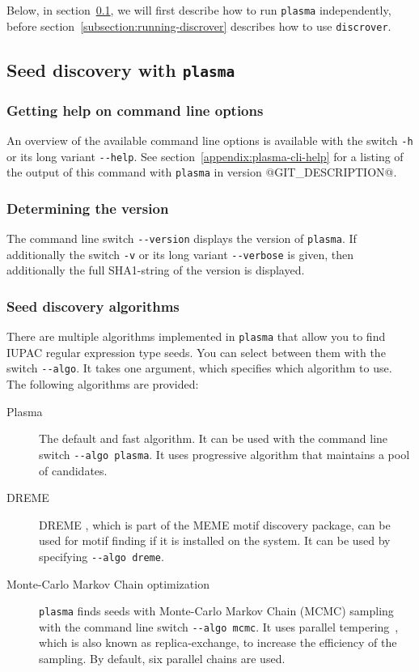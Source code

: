 \documentclass[a4paper]{article}
\makeatletter
\newcommand{\plasma}[0]{\texttt{plasma}}
\newcommand{\discrover}[0]{\texttt{discrover}}
\newcommand{\version}[0]{@GIT_DESCRIPTION@}
\makeatother
\begin{document}
Below, in section~\ref{subsection:running-plasma}, we will first describe how to run \plasma{} independently, before section~\ref{subsection:running-discrover} describes how to use \discrover{}.

\subsection{Seed discovery with \plasma{}}
\label{subsection:running-plasma}
\subsubsection{Getting help on command line options}
An overview of the available command line options is available with the switch \verb|-h| or its long variant \verb|--help|.
See section~\ref{appendix:plasma-cli-help} for a listing of the output of this command with \plasma{} in version \version{}.
\subsubsection{Determining the version}
The command line switch \verb|--version| displays the version of \plasma{}.
If additionally the switch \verb|-v| or its long variant \verb|--verbose| is given, then additionally the full SHA1-string of the version is displayed.

\subsubsection{Seed discovery algorithms}
\label{section:plasma-MCMC}
There are multiple algorithms implemented in \plasma{} that allow you to find IUPAC regular expression type seeds.
You can select between them with the switch \verb|--algo|.
It takes one argument, which specifies which algorithm to use.
The following algorithms are provided:
\begin{description}
  \item[Plasma]
    The default and fast algorithm.
    It can be used with the command line switch \verb|--algo plasma|.
    It uses progressive algorithm that maintains a pool of candidates.
  \item[DREME]
    DREME \cite{Bailey2011}, which is part of the MEME motif discovery package, can be used for motif finding if it is installed on the system.
    It can be used by specifying \verb|--algo dreme|.
  \item[Monte-Carlo Markov Chain optimization]
    \plasma{} finds seeds with Monte-Carlo Markov Chain (MCMC) sampling with the command line switch \verb|--algo mcmc|.
    It uses parallel tempering~\cite{Earl2005}, which is also known as replica-exchange, to increase the efficiency of the sampling.
    By default, six parallel chains are used.
\end{description}
\end{document}
